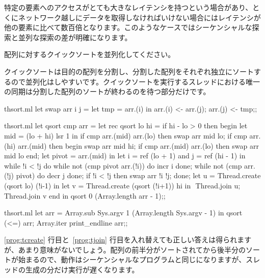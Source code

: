 特定の要素へのアクセスがとても大きなレイテンシを持つという場合があり、とくにネットワーク越しにデータを取得しなければいけない場合にはレイテンシが他の要素に比べて数百倍となります。このようなケースではシーケンシャルな探索と並列な探索の差が明確になります。
\medskip
\begin{exercise}
\label{ex/qsort}
配列に対するクイックソートを並列化してください。
\end{exercise}
\begin{answer}
クイックソートは目的の配列を分割し、分割した配列をそれぞれ独立にソートするので並列化はしやすいです。クイックソートを実行するスレッドにおける唯一の同期は分割した配列のソートが終わるのを待つ部分だけです。

\begin{codefile}{thsort.ml}
let swap arr i j =
  let tmp = arr.(i) in
  arr.(i) <- arr.(j);
  arr.(j) <- tmp;;
\end{codefile}
\begin{listingcodefile}[style=numbers]{thsort.ml}
let qsort cmp arr =
  let rec qsort lo hi =
  if hi - lo > 0 then
    begin
      let mid = (lo + hi) lsr 1 in
      if cmp arr.(mid) arr.(lo) then swap arr mid lo;
      if cmp arr.(hi) arr.(mid) then
        begin
          swap arr mid hi;
          if cmp arr.(mid) arr.(lo) then swap arr mid lo
        end;
      let pivot = arr.(mid) in
      let i = ref (lo + 1) and j = ref (hi - 1) in
      while !i < !j do
        while not (cmp pivot arr.(!i)) do incr i done;
        while not (cmp arr.(!j) pivot) do decr j done;
        if !i < !j then swap arr !i !j;
      done;
      let u = Thread.create (qsort lo) (!i-1) in
      let v = Thread.create (qsort (!i+1)) hi in $\label{prog:tcreate}$
      Thread.join u; $\label{prog:tjoin}$
      Thread.join v
    end in
  qsort 0 (Array.length arr - 1);;
\end{listingcodefile}
%
\begin{codefile}{thsort.ml}
let arr = Array.sub Sys.argv 1 (Array.length Sys.argv - 1) in
qsort (<=) arr;
Array.iter print_endline arr;;
\end{codefile}
%
\ref{prog:tcreate} 行目と~\ref{prog:tjoin} 行目を入れ替えても正しい答えは得られますが、あまり意味がないでしょう。配列の前半分がソートされてから後半分のソートが始まるので、動作はシーケンシャルなプログラムと同じになりますが、スレッドの生成の分だけ実行が遅くなります。


\end{answer}
